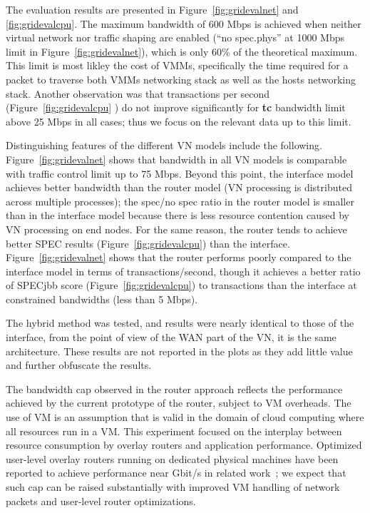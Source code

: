 The evaluation results are presented in Figure~\ref{fig:gridevalnet} and
\ref{fig:gridevalcpu}.  The maximum bandwidth of 600 Mbps is achieved when
neither virtual network nor traffic shaping are enabled (``no spec.phys'' at
1000 Mbps limit in Figure~\ref{fig:gridevalnet}),
which is only 60\% of the theoretical maximum.  This limit is most likley the
cost of VMMs, specifically the time required for a packet to traverse both VMMs
networking stack as well as the hosts networking stack.  Another observation
was that transactions per second (Figure~\ref{fig:gridevalcpu}
) do not improve significantly for \textbf{tc} bandwidth
limit above 25 Mbps in all cases; thus we focus on the relevant data up to this
limit.

Distinguishing features of the different VN models include the following.
Figure~\ref{fig:gridevalnet} shows that bandwidth in
all VN models is comparable with traffic control limit up to 75 Mbps. Beyond
this point, the interface model achieves better bandwidth than the router model
(VN processing is distributed across multiple processes); the spec/no spec
ratio in the router model is smaller than in the interface model because there
is less resource contention caused by VN processing on end nodes. For the same
reason, the router tends to achieve better SPEC results
(Figure~\ref{fig:gridevalcpu}) than the interface.
Figure~\ref{fig:gridevalnet} shows that the router
performs poorly compared to the interface model in terms of
transactions/second, though it achieves a better ratio of SPECjbb score
(Figure~\ref{fig:gridevalcpu}) to transactions than the 
interface at constrained bandwidths (less than 5 Mbps).

The hybrid method was tested, and results were nearly identical to those of the
interface, from the point of view of the WAN part of the VN, it is the
same architecture.  These results are not reported in the plots as they
add little value and further obfuscate the results.

The bandwidth cap observed in the router approach reflects the performance
achieved by the current prototype of the router, subject to VM overheads. The
use of VM is an assumption that is valid in the domain of cloud computing
where all resources run in a VM. This experiment focused on the interplay
between resource consumption by overlay routers and application performance.
Optimized user-level overlay routers running on dedicated physical
machines have been reported to achieve performance near Gbit/s in related
work~\cite{vine2}; we expect that such cap can be raised substantially with
improved VM handling of network packets and user-level router optimizations.

